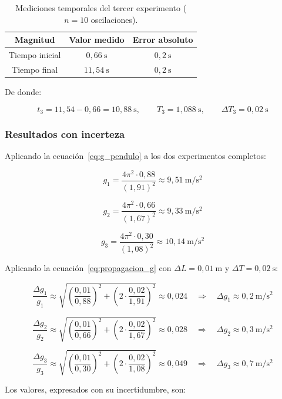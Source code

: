 \begin{table}[h!]
\centering
\begin{tabular}{|c|c|c|}
\hline
\textbf{Magnitud} & \textbf{Valor medido} & \textbf{Error absoluto} \\ \hline
Tiempo inicial   & $0{,}66\ \mathrm{s}$  & $0{,}2\ \mathrm{s}$  \\ \hline
Tiempo final     & $11{,}54\ \mathrm{s}$ & $0{,}2\ \mathrm{s}$  \\ \hline
\end{tabular}
\caption{Mediciones temporales del tercer experimento ($n = 10$ oscilaciones).}
\end{table}

De donde:

\[
t_3 = 11{,}54 - 0{,}66 = 10{,}88\ \mathrm{s},
\qquad
T_3 = 1{,}088\ \mathrm{s},
\qquad
\Delta T_3  = 0{,}02\ \mathrm{s}
\]

\subsubsection{Resultados con incerteza}

Aplicando la ecuación~\ref{eq:g_pendulo} a los dos experimentos completos:

\[
g_1 = \frac{4\pi^2 \cdot 0{,}88}{(1{,}91)^2} \approx 9{,}51\ \mathrm{m/s^2}
\]

\[
g_2 = \frac{4\pi^2 \cdot 0{,}66}{(1{,}67)^2} \approx 9{,}33\ \mathrm{m/s^2}
\]

\[
g_3 = \frac{4\pi^2 \cdot 0{,}30}{(1{,}08)^2} \approx 10{,}14\ \mathrm{m/s^2}
\]

Aplicando la ecuación~\ref{eq:propagacion_g} con $\Delta L = 0{,}01\ \mathrm{m}$ y $\Delta T = 0{,}02\ \mathrm{s}$:

\[
\frac{\Delta g_1}{g_1} \approx \sqrt{\left(\frac{0{,}01}{0{,}88}\right)^2 + \left(2\cdot\frac{0{,}02}{1{,}91}\right)^2} \approx 0{,}024
\quad\Longrightarrow\quad
\Delta g_1 \approx 0{,}2\ \mathrm{m/s^2}
\]

\[
\frac{\Delta g_2}{g_2} \approx \sqrt{\left(\frac{0{,}01}{0{,}66}\right)^2 + \left(2\cdot\frac{0{,}02}{1{,}67}\right)^2} \approx 0{,}028
\quad\Longrightarrow\quad
\Delta g_2 \approx 0{,}3\ \mathrm{m/s^2}
\]

\[
\frac{\Delta g_3}{g_3} \approx \sqrt{\left(\frac{0{,}01}{0{,}30}\right)^2 + \left(2\cdot\frac{0{,}02}{1{,}08}\right)^2} \approx 0{,}049
\quad\Longrightarrow\quad
\Delta g_3 \approx 0{,}7\ \mathrm{m/s^2}
\]

Los valores, expresados con su incertidumbre, son:

